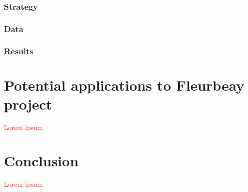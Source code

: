 \documentclass[12pt,a4paper,draft]{article}
\begin{document}
\subsubsection*{Strategy}
\subsubsection*{Data}
\subsubsection*{Results}



\section{Potential applications to Fleurbeay project}
\textcolor{red}{Lorem ipsum}





\section{Conclusion}
\textcolor{red}{Lorem ipsum}


\newpage
\end{document}
